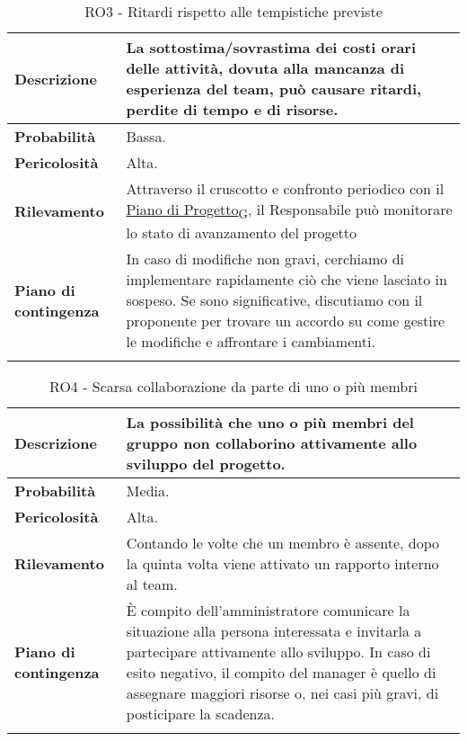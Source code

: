 \begin{longtable}{|l|p{10cm}|}
    \hline
    \textbf{Descrizione} & La sottostima/sovrastima dei costi orari delle attività, dovuta alla mancanza di esperienza del team, può causare ritardi, perdite di tempo e di risorse. \\ 
    \hline
    \textbf{Probabilità} & Bassa. \\
    \hline
    \textbf{Pericolosità} & Alta. \\
    \hline
    \textbf{Rilevamento} & Attraverso il cruscotto e confronto periodico con il \href{https://7last.github.io/docs/rtb/documentazione-interna/glossario#piano-di-progetto}{Piano di Progetto\textsubscript{G}}, il Responsabile può monitorare lo stato di avanzamento del progetto \\
    \hline
    \textbf{Piano di contingenza} & In caso di modifiche non gravi, cerchiamo di implementare rapidamente ciò che viene lasciato in sospeso. Se sono significative, discutiamo con il proponente per trovare un accordo su come gestire le modifiche e affrontare i cambiamenti.\\
    \hline
    \caption{RO3 - Ritardi rispetto alle tempistiche previste}
    \label{table:3}
\end{longtable}

\newpage

\begin{longtable}{|l|p{10cm}|}
    \hline
    \textbf{Descrizione} & La possibilità che uno o più membri del gruppo non collaborino attivamente allo sviluppo del progetto. \\ 
    \hline
    \textbf{Probabilità} & Media. \\
    \hline
    \textbf{Pericolosità} & Alta. \\
    \hline
    \textbf{Rilevamento} & Contando le volte che un membro è assente, dopo la quinta volta viene attivato un rapporto interno al team.\\
    \hline
    \textbf{Piano di contingenza} & È compito dell'amministratore comunicare la situazione alla persona interessata e invitarla a partecipare attivamente allo sviluppo. In caso di esito negativo, il compito del manager è quello di assegnare maggiori risorse o, nei casi più gravi, di posticipare la scadenza.\\
    \hline
    \caption{RO4 - Scarsa collaborazione da parte di uno o più membri}
    \label{table:4}
\end{longtable}


